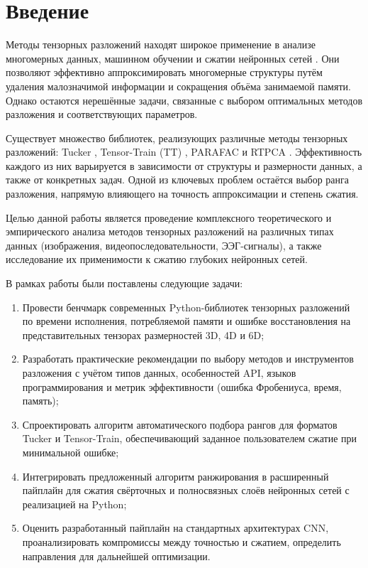 \chapter{Введение}
\label{chap:intro}


Методы тензорных разложений находят широкое применение в анализе многомерных данных, машинном обучении и сжатии нейронных сетей \cite{tensor_decompositions_for_data_science, tensor_computation_for_data_analysis}. Они позволяют эффективно аппроксимировать многомерные структуры путём удаления малозначимой информации и сокращения объёма занимаемой памяти. Однако остаются нерешённые задачи, связанные с выбором оптимальных методов разложения и соответствующих параметров.

Существует множество библиотек, реализующих различные методы тензорных разложений: Tucker \cite{tensorly_parafac_tucker}, Tensor-Train (TT) \cite{tensorly_tensor_train}, PARAFAC \cite{tensorly_parafac_tucker, tensorly_parafac_2, tensorly_parafac_3, tensor_decompositions_for_data_science, tensor_computation_for_data_analysis} и RTPCA \cite{rtpca_method}. Эффективность каждого из них варьируется в зависимости от структуры и размерности данных, а также от конкретных задач. Одной из ключевых проблем остаётся выбор ранга разложения, напрямую влияющего на точность аппроксимации и степень сжатия.

Целью данной работы является проведение комплексного теоретического и эмпирического анализа методов тензорных разложений на различных типах данных (изображения, видеопоследовательности, ЭЭГ-сигналы), а также исследование их применимости к сжатию глубоких нейронных сетей.

В рамках работы были поставлены следующие задачи:
\begin{enumerate}
  \item Провести бенчмарк современных Python-библиотек тензорных разложений по времени исполнения, потребляемой памяти и ошибке восстановления на представительных тензорах размерностей 3D, 4D и 6D;
  \item Разработать практические рекомендации по выбору методов и инструментов разложения с учётом типов данных, особенностей API, языков программирования и метрик эффективности (ошибка Фробениуса, время, память);
  \item Спроектировать алгоритм автоматического подбора рангов для форматов Tucker и Tensor-Train, обеспечивающий заданное пользователем сжатие при минимальной ошибке;
  \item Интегрировать предложенный алгоритм ранжирования в расширенный пайплайн для сжатия свёрточных и полносвязных слоёв нейронных сетей с реализацией на Python;
  \item Оценить разработанный пайплайн на стандартных архитектурах CNN, проанализировать компромиссы между точностью и сжатием, определить направления для дальнейшей оптимизации.
\end{enumerate}

